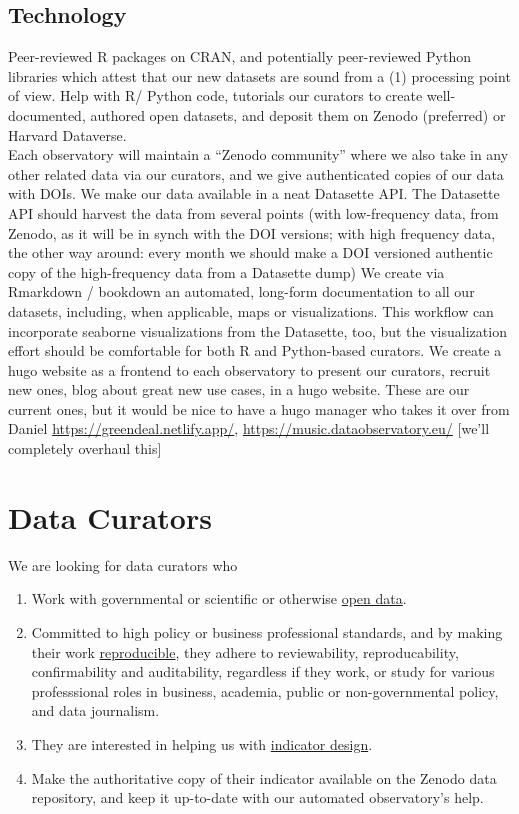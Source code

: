 \documentclass[
  a4paper,
  openany, a4paper, oneside]{book}
\providecommand{\tightlist}{%
  \setlength{\itemsep}{0pt}\setlength{\parskip}{0pt}}
\begin{document}
\hypertarget{technology}{%
\section{Technology}\label{technology}}

Peer-reviewed R packages on CRAN, and potentially peer-reviewed Python libraries which attest that our new datasets are sound from a (1) processing point of view.
Help with R/ Python code, tutorials our curators to create well-documented, authored open datasets, and deposit them on Zenodo (preferred) or Harvard Dataverse.\\
Each observatory will maintain a ``Zenodo community'' where we also take in any other related data via our curators, and we give authenticated copies of our data with DOIs.
We make our data available in a neat Datasette API. The Datasette API should harvest the data from several points (with low-frequency data, from Zenodo, as it will be in synch with the DOI versions; with high frequency data, the other way around: every month we should make a DOI versioned authentic copy of the high-frequency data from a Datasette dump)
We create via Rmarkdown / bookdown an automated, long-form documentation to all our datasets, including, when applicable, maps or visualizations.
This workflow can incorporate seaborne visualizations from the Datasette, too, but the visualization effort should be comfortable for both R and Python-based curators.
We create a hugo website as a frontend to each observatory to present our curators, recruit new ones, blog about great new use cases, in a hugo website. These are our current ones, but it would be nice to have a hugo manager who takes it over from Daniel \url{https://greendeal.netlify.app/}, \url{https://music.dataobservatory.eu/} {[}we'll completely overhaul this{]}

\hypertarget{data-curators}{%
\chapter{Data Curators}\label{data-curators}}

We are looking for data curators who

\begin{enumerate}
\def\labelenumi{\arabic{enumi}.}
\tightlist
\item
  Work with governmental or scientific or otherwise \protect\hyperlink{open-data}{open data}.
\item
  Committed to high policy or business professional standards, and by making their work \protect\hyperlink{reproducible-research}{reproducible}, they adhere to reviewability, reproducability, confirmability and auditability, regardless if they work, or study for various professsional roles in business, academia, public or non-governmental policy, and data journalism.
\item
  They are interested in helping us with \protect\hyperlink{indicator-design}{indicator design}.
\item
  Make the authoritative copy of their indicator available on the Zenodo data repository, and keep it up-to-date with our automated observatory's help.
\end{enumerate}
\end{document}
